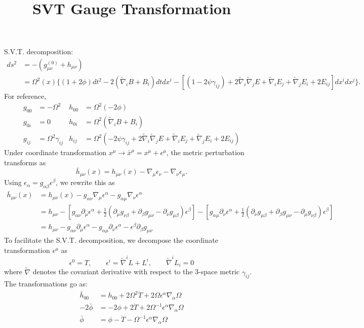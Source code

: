 \documentclass[10pt,letterpaper]{article}
\title{SVT Gauge Transformation}
\date{}
\begin{document}
\maketitle
\noindent S.V.T. decomposition:
\begin{align}
	ds^2 &= -(g_{\mu\nu}^{(0)}+h_{\mu\nu})\nonumber \\
	&= \Omega^2(x)\{(1+2\phi)dt^2 - 2(\tilde\nabla_i B + B_i)dtdx^i -[(1-2\psi \gamma_{ij})+2\tilde\nabla_i\tilde \nabla_j E + \tilde\nabla _i E_j +\tilde \nabla_j E_i + 2E_{ij}]dx^idx^j\}.
\end{align}
For reference,
\begin{align}
	g_{00} &=-\Omega^2 	&h_{00} &=\Omega^2( -2\phi)\\
	 g_{0i} &=0  &h_{0i} &= \Omega^2(\tilde\nabla_i B + B_i)\\
	 g_{ij} &=\Omega^2 \gamma_{ij}  &h_{ij} &= \Omega^2(-2\psi \gamma_{ij} + 
	2\tilde\nabla_i\tilde\nabla_j E + \tilde\nabla _i E_j + \tilde\nabla_j E_i + 2E_{ij})
	\end{align}
Under coordinate transformation $x^\mu \to \bar x^\mu = x^\mu + \epsilon^\mu$, the metric perturbation transforms as
\begin{equation}
	\bar h_{\mu\nu}(x) = h_{\mu\nu}(x) - \nabla_\mu \epsilon_\nu - \nabla_\nu \epsilon_\mu.
\end{equation}
Using $\epsilon_{\alpha} = g_{\alpha\beta}\epsilon^\beta$, we rewrite this as
\begin{align}
	\bar h_{\mu\nu}(x) &= h_{\mu\nu}(x) - g_{\alpha\nu}\nabla_\mu \epsilon^\alpha - g_{\alpha\mu}\nabla_\nu \epsilon^\alpha\\
	&= h_{\mu\nu} - [g_{\alpha\nu}\partial_\mu \epsilon^\alpha + \tfrac12(\partial_\mu g_{\nu\beta} + \partial_\beta g_{\mu\nu} - \partial_\nu g_{\mu\beta})\epsilon^\beta ]-[g_{\alpha\mu}\partial_\nu \epsilon^\alpha + \tfrac12(\partial_\nu g_{\mu\beta} + \partial_\beta g_{\mu\nu} - \partial_\mu g_{\nu\beta})\epsilon^\beta ]\\
	&= h_{\mu\nu} - g_{\alpha\nu}\partial_\mu \epsilon^\alpha - g_{\alpha\mu}\partial_\nu \epsilon^\alpha -\epsilon^\beta \partial_\beta g_{\mu\nu} 
\end{align}
To facilitate the S.V.T. decomposition, we decompose the coordinate transformation $\epsilon^\mu$ as
\[
	\epsilon^0 = T,\qquad \epsilon^i = \tilde\nabla^i L + L^i,\qquad \tilde\nabla^i L_i = 0
\]
where $\tilde\nabla$ denotes the covariant derivative with respect to the 3-space metric $\gamma_{ij}$. The transformations go as:
\begin{align}
	\bar h_{00} &=  h_{00} + 2\Omega^2 \dot T + 2\Omega \epsilon^\alpha \nabla_\alpha \Omega\\
	-2\bar\phi &= -2 \phi +2\dot T +2 \Omega^{-1}\epsilon^\alpha \nabla_\alpha \Omega\\
	\bar\phi &= \phi - \dot T - \Omega^{-1}\epsilon^\alpha \nabla_\alpha \Omega
\end{align}
\end{document}
